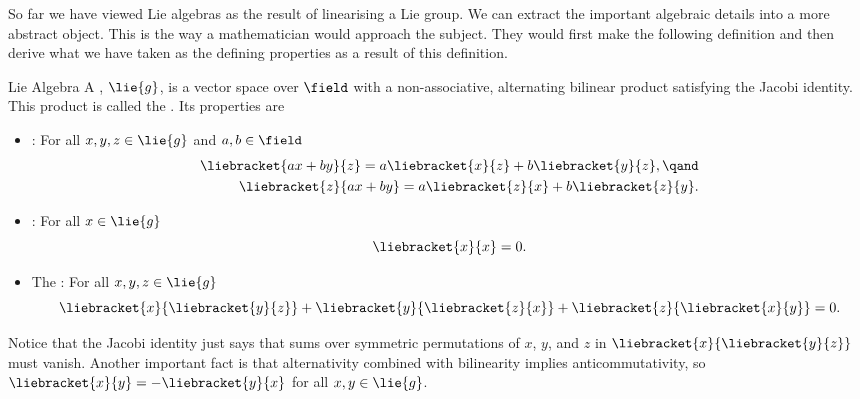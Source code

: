 So far we have viewed Lie algebras as the result of linearising a Lie group.
We can extract the important algebraic details into a more abstract object.
This is the way a mathematician would approach the subject.
They would first make the following definition and then derive what we have taken as the defining properties as a result of this definition.
\begin{dfn}{Lie Algebra}{}
    A , \(\lie{g}\), is a vector space over \(\field\) with a non-associative, alternating bilinear product satisfying the Jacobi identity.
    This product is called the .
    Its properties are
    \begin{itemize}
        \item {}: For all \(x, y, z \in \lie{g}\) and \(a, b \in \field\)
        \begin{align}
            \liebracket{ax + by}{z} = a\liebracket{x}{z} + b\liebracket{y}{z}, \qand\\
            \liebracket{z}{ax + by} = a\liebracket{z}{x} + b\liebracket{z}{y}.
        \end{align}
        \item {}: For all \(x \in \lie{g}\)
        \begin{equation}
            \liebracket{x}{x} = 0.
        \end{equation}
        \item The : For all \(x, y, z \in \lie{g}\)
        \begin{equation}
            \liebracket{x}{\liebracket{y}{z}} + \liebracket{y}{\liebracket{z}{x}} + \liebracket{z}{\liebracket{x}{y}} = 0.
        \end{equation}
    \end{itemize}
\end{dfn}
Notice that the Jacobi identity just says that sums over symmetric permutations of \(x\), \(y\), and \(z\) in \(\liebracket{x}{\liebracket{y}{z}}\) must vanish.
Another important fact is that alternativity combined with bilinearity implies anticommutativity, so \(\liebracket{x}{y} = -\liebracket{y}{x}\) for all \(x, y \in \lie{g}\).

